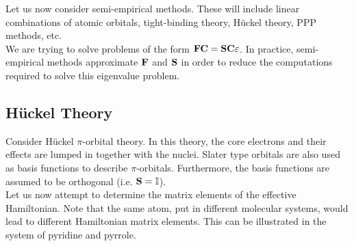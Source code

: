 \documentclass[12pt,a4paper,titlepage]{article}
\newcommand{\id}{\mathbb{I}} %
\begin{document}
Let us now consider semi-empirical methods. These will include linear combinations of atomic orbitals, tight-binding theory, H\"{u}ckel theory, PPP methods, etc.\\

We are trying to solve problems of the form $\vb{FC}=\vb{SC\varepsilon}$. In practice, semi-empirical methods approximate $\vb{F}$ and $\vb{S}$ in order to reduce the computations required to solve this eigenvalue problem.\\

\subsection{H\"{u}ckel Theory}
Consider H\"{u}ckel $\pi$-orbital theory. In this theory, the core electrons and their effects are lumped in together with the nuclei. Slater type orbitals are also used as basis functions to describe $\pi$-orbitals. Furthermore, the basis functions are assumed to be orthogonal (i.e. $\vb{S}=\id$).\\

Let us now attempt to determine the matrix elements of the effective Hamiltonian. Note that the same atom, put in different molecular systems, would lead to different Hamiltonian matrix elements. This can be illustrated in the system of pyridine and pyrrole.
\end{document}

